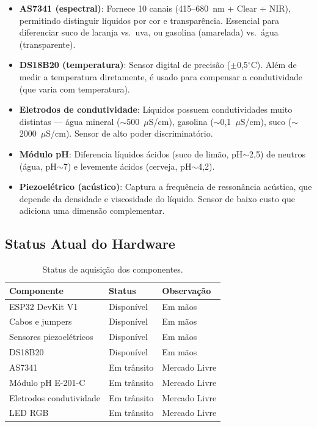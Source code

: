 \documentclass[12pt, a4paper]{article}
\begin{document}
\begin{itemize}
  \item \textbf{AS7341 (espectral)}: Fornece 10 canais (415--680~nm + Clear + NIR), permitindo distinguir l\'{i}quidos por cor e transpar\^{e}ncia. Essencial para diferenciar suco de laranja vs.\ uva, ou gasolina (amarelada) vs.\ \'{a}gua (transparente).
  \item \textbf{DS18B20 (temperatura)}: Sensor digital de precis\~{a}o ($\pm$0,5$^\circ$C). Al\'{e}m de medir a temperatura diretamente, \'{e} usado para compensar a condutividade (que varia com temperatura).
  \item \textbf{Eletrodos de condutividade}: L\'{i}quidos possuem condutividades muito distintas --- \'{a}gua mineral ($\sim$500~$\mu$S/cm), gasolina ($\sim$0,1~$\mu$S/cm), suco ($\sim$2000~$\mu$S/cm). Sensor de alto poder discriminat\'{o}rio.
  \item \textbf{M\'{o}dulo pH}: Diferencia l\'{i}quidos \'{a}cidos (suco de limão, pH$\sim$2,5) de neutros (\'{a}gua, pH$\sim$7) e levemente \'{a}cidos (cerveja, pH$\sim$4,2).
  \item \textbf{Piezoel\'{e}trico (ac\'{u}stico)}: Captura a frequ\^{e}ncia de resson\^{a}ncia ac\'{u}stica, que depende da densidade e viscosidade do l\'{i}quido. Sensor de baixo custo que adiciona uma dimens\~{a}o complementar.
\end{itemize}

\subsection{Status Atual do Hardware}

\begin{table}[H]
  \centering
  \caption{Status de aquisi\c{c}\~{a}o dos componentes.}
  \label{tab:status}
  \begin{tabular}{lll}
    \toprule
    \textbf{Componente} & \textbf{Status} & \textbf{Observa\c{c}\~{a}o} \\
    \midrule
    ESP32 DevKit V1        & Dispon\'{i}vel & Em m\~{a}os \\
    Cabos e jumpers        & Dispon\'{i}vel & Em m\~{a}os \\
    Sensores piezoel\'{e}tricos & Dispon\'{i}vel & Em m\~{a}os \\
    DS18B20                & Dispon\'{i}vel & Em m\~{a}os \\
    AS7341                 & Em tr\^{a}nsito & Mercado Livre \\
    M\'{o}dulo pH E-201-C      & Em tr\^{a}nsito & Mercado Livre \\
    Eletrodos condutividade & Em tr\^{a}nsito & Mercado Livre \\
    LED RGB                & Em tr\^{a}nsito & Mercado Livre \\
    \bottomrule
  \end{tabular}
\end{table}
\end{document}
